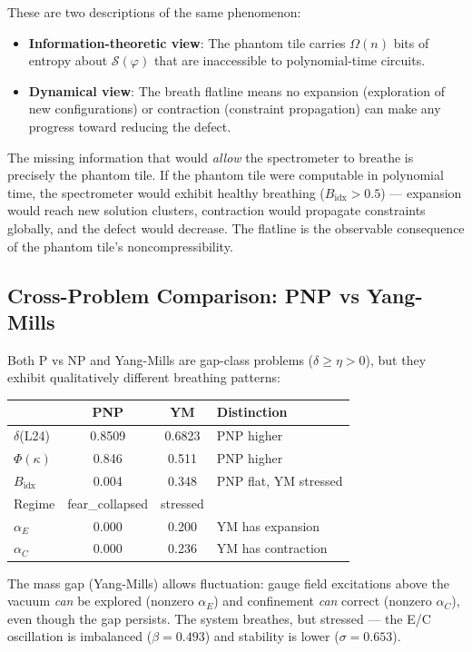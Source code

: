 \documentclass[11pt]{article}
\theoremstyle{definition}
\theoremstyle{remark}
\newcommand{\calS}{\mathcal{S}}
\begin{document}
These are two descriptions of the same phenomenon:
\begin{itemize}[nosep]
  \item \textbf{Information-theoretic view}: The phantom tile carries
    $\Omega(n)$ bits of entropy about $\calS(\varphi)$ that are inaccessible
    to polynomial-time circuits.
  \item \textbf{Dynamical view}: The breath flatline means no expansion
    (exploration of new configurations) or contraction (constraint
    propagation) can make any progress toward reducing the defect.
\end{itemize}
The missing information that would \emph{allow} the spectrometer to breathe
is precisely the phantom tile.  If the phantom tile were computable in
polynomial time, the spectrometer would exhibit healthy breathing
($B_{\mathrm{idx}} > 0.5$) --- expansion would reach new solution clusters,
contraction would propagate constraints globally, and the defect would
decrease.  The flatline is the observable consequence of the phantom tile's
noncompressibility.

\subsection{Cross-Problem Comparison: PNP vs Yang-Mills}

Both P vs NP and Yang-Mills are gap-class problems ($\delta \geq \eta > 0$),
but they exhibit qualitatively different breathing patterns:

\begin{center}
\begin{tabular}{@{}lccl@{}}
\toprule
& \textbf{PNP} & \textbf{YM} & \textbf{Distinction} \\
\midrule
$\delta$(L24) & 0.8509 & 0.6823 & PNP higher \\
$\Phi(\kappa)$ & 0.846 & 0.511 & PNP higher \\
$B_{\mathrm{idx}}$ & 0.004 & 0.348 & PNP flat, YM stressed \\
Regime & fear\_collapsed & stressed & \\
$\alpha_E$ & 0.000 & 0.200 & YM has expansion \\
$\alpha_C$ & 0.000 & 0.236 & YM has contraction \\
\bottomrule
\end{tabular}
\end{center}

\noindent
The mass gap (Yang-Mills) allows fluctuation: gauge field excitations above
the vacuum \emph{can} be explored (nonzero $\alpha_E$) and confinement
\emph{can} correct (nonzero $\alpha_C$), even though the gap persists.  The
system breathes, but stressed --- the E/C oscillation is imbalanced
($\beta = 0.493$) and stability is lower ($\sigma = 0.653$).
\end{document}
